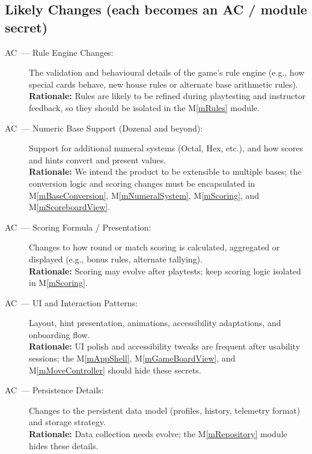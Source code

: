 \documentclass[12pt, titlepage]{article}
\newcounter{acnum}
\newcommand{\actheacnum}{AC\theacnum}
\newcommand{\mref}[1]{M\ref{#1}}
\begin{document}
\subsection{Likely Changes (each becomes an AC / module secret)}
\begin{description}
  \item[\label{acRules} \actheacnum\ --- Rule Engine Changes:] 
    The validation and behavioural details of the game's rule engine (e.g., how special cards behave, new house rules or alternate base arithmetic rules).  
    \\
    \textbf{Rationale:} Rules are likely to be refined during playtesting and instructor feedback, so they should be isolated in the \mref{mRules} module.

  \item[\label{acBases} \actheacnum\ --- Numeric Base Support (Dozenal and beyond):] 
    Support for additional numeral systems (Octal, Hex, etc.), and how scores and hints convert and present values.  
    \\
    \textbf{Rationale:} We intend the product to be extensible to multiple bases; the conversion logic and scoring changes must be encapsulated in \mref{mBaseConversion}, \mref{mNumeralSystem}, \mref{mScoring}, and \mref{mScoreboardView}.

  \item[\label{acScoring} \actheacnum\ --- Scoring Formula / Presentation:] 
    Changes to how round or match scoring is calculated, aggregated or displayed (e.g., bonus rules, alternate tallying).  
    \\
    \textbf{Rationale:} Scoring may evolve after playtests; keep scoring logic isolated in \mref{mScoring}.

  \item[\label{acUI} \actheacnum\ --- UI and Interaction Patterns:] 
    Layout, hint presentation, animations, accessibility adaptations, and onboarding flow.  
    \\
    \textbf{Rationale:} UI polish and accessibility tweaks are frequent after usability sessions; the \mref{mAppShell}, \mref{mGameBoardView}, and \mref{mMoveController} should hide these secrets.

  \item[\label{acSchema} \actheacnum\ --- Persistence Details:] 
    Changes to the persistent data model (profiles, history, telemetry format) and storage strategy.  
    \\
    \textbf{Rationale:} Data collection needs evolve; the \mref{mRepository} module hides these details.


\end{description}
\end{document}
